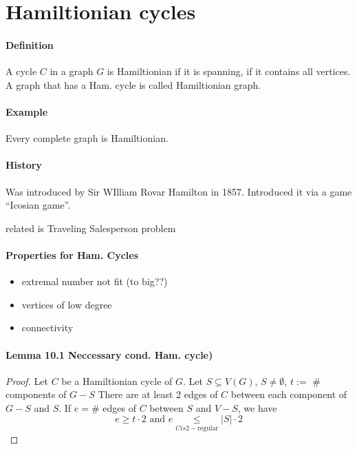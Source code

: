 \section{Hamiltionian cycles}
\paragraph{Definition}
A cycle $ C $ in a graph $ G $ is Hamiltionian if it is spanning, if
it contains all vertices. \\
A graph that has a Ham. cycle is called Hamiltionian graph.

\paragraph{Example}
Every complete graph is Hamiltionian.

\paragraph{History} Was introduced by Sir WIlliam Rovar Hamilton 
in 1857. Introduced it via a game \enquote{Icosian game}.

\smallskip 
related is Traveling Salesperson problem

\paragraph{Properties for Ham. Cycles}
\begin{itemize}
    \item extremal number not fit (to big??)
    \item vertices of low degree
    \item connectivity
\end{itemize}

\paragraph{Lemma 10.1 Neccessary cond. Ham. cycle)}
\begin{proof}
    Let $ C $ be a Hamiltionian cycle of $ G$.
    Let $ S \subseteq V(G) $, $ S \neq \emptyset $, $ t := $ \# components of $ G - S $
    There are at least 2 edges of $ C $ between each component of $ G - S $
    and $ S$. If $ e = \#$ edges of $ C $ between $ S $ and $ V - S$, 
    we have 
    $$ e \geq t \cdot 2 \text{ and } e \underset{C is 2-\text{regular}}{\leq}
    |S| \cdot 2 $$ 
\end{proof}

